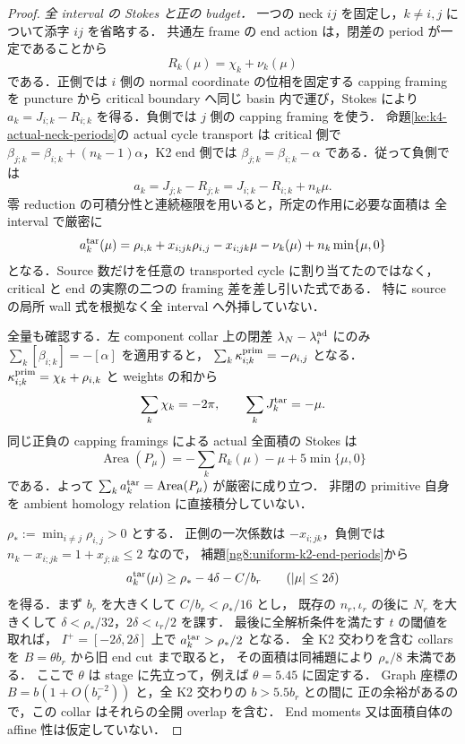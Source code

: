 \begin{proof}
\emph{全 interval の Stokes と正の budget．}
一つの neck $ij$ を固定し，$k\ne i,j$ について添字 $ij$ を省略する．
共通左 frame の end action は，閉差の period が一定であることから
\[
 R_k(\mu)=\chi_k+\nu_k(\mu)
\]
である．正側では $i$ 側の normal coordinate の位相を固定する capping framing を
puncture から critical boundary へ同じ basin 内で運び，Stokes により
$a_k=J_{i;k}-R_{i;k}$ を得る．負側では $j$ 側の capping framing を使う．
命題\ref{ke:k4-actual-neck-periods}の actual cycle transport は critical 側で
$\beta_{j;k}=\beta_{i;k}+(n_k-1)\alpha$，K2 end 側では
$\beta_{j;k}=\beta_{i;k}-\alpha$ である．従って負側では
\[
 a_k=J_{j;k}-R_{j;k}=J_{i;k}-R_{i;k}+n_k\mu .
\]
零 reduction の可積分性と連続極限を用いると，所定の作用に必要な面積は
全 interval で厳密に
\begin{equation}\label{ng8:eq:full-moment-target-areas}
 a_k^{\rm tar}(\mu)
 =\rho_{i,k}+x_{i;jk}\rho_{i,j}-x_{i;jk}\mu-\nu_k(\mu)
    +n_k\min\{\mu,0\}
\end{equation}
となる．Source 数だけを任意の transported cycle に割り当てたのではなく，
critical と end の実際の二つの framing 差を差し引いた式である．
特に source の局所 wall 式を根拠なく全 interval へ外挿していない．

全量も確認する．左 component collar 上の閉差
$\lambda_N-\lambda_i^{\rm ad}$ にのみ
$\sum_k[\beta_{i;k}]=-[\alpha]$ を適用すると，
$\sum_k\kappa^{\rm prim}_{i;k}=-\rho_{i,j}$ となる．
$\kappa^{\rm prim}_{i;k}=\chi_k+\rho_{i,k}$ と weights の和から
\[
 \sum_k\chi_k=-2\pi,\qquad \sum_kJ_k^{\rm tar}=-\mu .
\]
同じ正負の capping framings による actual 全面積の Stokes は
\begin{equation}\label{ng8:eq:full-moment-total-area}
 \operatorname{Area}(P_\mu)
   =-\sum_kR_k(\mu)-\mu+5\min\{\mu,0\}
\end{equation}
である．よって $\sum_ka_k^{\rm tar}=\operatorname{Area}(P_\mu)$ が厳密に成り立つ．
非閉の primitive 自身を ambient homology relation に直接積分していない．

$\rho_*:=\min_{i\ne j}\rho_{i,j}>0$ とする．
正側の一次係数は $-x_{i;jk}$，負側では
$n_k-x_{i;jk}=1+x_{j;ik}\le2$ なので，
補題\ref{ng8:uniform-k2-end-periods}から
\[
 a_k^{\rm tar}(\mu)\ge\rho_*-4\delta-C/b_r
 \qquad(|\mu|\le2\delta)
\]
を得る．まず $b_r$ を大きくして $C/b_r<\rho_*/16$ とし，
既存の $n_r,\iota_r$ の後に $N_r$ を大きくして
$\delta<\rho_*/32$，$2\delta<\iota_r/2$ を課す．
最後に全解析条件を満たす $t$ の閾値を取れば，
$I^+=[-2\delta,2\delta]$ 上で $a_k^{\rm tar}>\rho_*/2$ となる．
全 K2 交わりを含む collars を $B=\theta b_r$ から旧 end cut まで取ると，
その面積は同補題により $\rho_*/8$ 未満である．
ここで $\theta$ は stage に先立って，例えば $\theta=5.45$ に固定する．
Graph 座標の $B=b(1+O(b_r^{-2}))$ と，全 K2 交わりの $b>5.5b_r$ との間に
正の余裕があるので，この collar はそれらの全開 overlap を含む．
End moments 又は面積自体の affine 性は仮定していない．


\end{proof}
